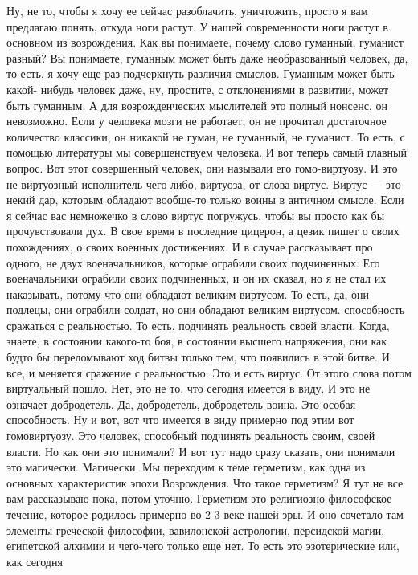 Ну, не то, чтобы я хочу ее сейчас разоблачить, уничтожить, просто я вам
предлагаю понять, откуда ноги растут. У нашей современности ноги растут в
основном из возрождения. Как вы понимаете, почему слово гуманный, гуманист
разный? Вы понимаете, гуманным может быть даже необразованный человек, да, то
есть, я хочу еще раз подчеркнуть различия смыслов. Гуманным может быть какой-
нибудь человек даже, ну, простите, с отклонениями в развитии, может быть
гуманным. А для возрожденческих мыслителей это полный нонсенс, он невозможно.
Если у человека мозги не работает, он не прочитал достаточное количество
классики, он никакой не гуман, не гуманный, не гуманист. То есть, с помощью
литературы мы совершенствуем человека. И вот теперь самый главный вопрос. Вот
этот совершенный человек, они называли его гомо-виртуозу. И это не виртуозный
исполнитель чего-либо, виртуоза, от слова виртус. Виртус — это некий дар,
которым обладают вообще-то только воины в античном смысле. Если я сейчас вас
немножечко в слово виртус погружусь, чтобы вы просто как бы прочувствовали дух.
В свое время в последние цицерон, а цезик пишет о своих похождениях, о своих
военных достижениях. И в случае рассказывает про одного, не двух военачальников,
которые ограбили своих подчиненных. Его военачальники ограбили своих
подчиненных, и он их сказал, но я не стал их наказывать, потому что они обладают
великим виртусом. То есть, да, они подлецы, они ограбили солдат, но они обладают
великим виртусом. способность сражаться с реальностью. То есть, подчинять
реальность своей власти. Когда, знаете, в состоянии какого-то боя, в состоянии
высшего напряжения, они как будто бы переломывают ход битвы только тем, что
появились в этой битве. И все, и меняется сражение с реальностью. Это и есть
виртус. От этого слова потом виртуальный пошло. Нет, это не то, что сегодня
имеется в виду. И это не означает добродетель. Да, добродетель, добродетель
воина. Это особая способность. Ну и вот, вот что имеется в виду примерно под
этим вот гомовиртуозу. Это человек, способный подчинять реальность своим, своей
власти. Но как они это понимали? И вот тут надо сразу сказать, они понимали это
магически. Магически. Мы переходим к теме герметизм, как одна из основных
характеристик эпохи Возрождения. Что такое герметизм? Я тут не все вам
рассказываю пока, потом уточню. Герметизм это религиозно-философское течение,
которое родилось примерно во 2-3 веке нашей эры. И оно сочетало там элементы
греческой философии, вавилонской астрологии, персидской магии, египетской
алхимии и чего-чего только еще нет. То есть это эзотерические или, как сегодня
